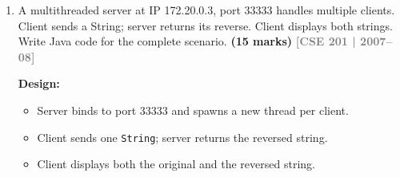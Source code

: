 \documentclass[12pt,a3paper]{article}
\newcommand{\yr}[1]{\hfill\textcolor{gray}{\small\textbf{[#1]}}}
\newcommand{\mk}[1]{\textcolor{orange!70!black}{\small\textbf{(#1 marks)}}}
\begin{document}
\begin{enumerate}
\begin{tcolorbox}
\medskip
\textbf{Step-by-step description:}

\begin{enumerate}[label=\textbf{\arabic*.}, itemsep=3pt]
  \item Server creates \texttt{ServerSocket} on port
  55555 and calls \texttt{accept()} --- it blocks,
  waiting for a client.
  \item Client creates \texttt{new Socket("server-IP",
  55555)}. The JVM performs the TCP three-way
  handshake (SYN, SYN-ACK, ACK).
  \item \texttt{accept()} returns a new
  \texttt{Socket} on the server side dedicated to
  this client. The \texttt{ServerSocket} resumes
  listening for more clients.
  \item Client writes data through
  \texttt{getOutputStream()}; server reads it via
  \texttt{getInputStream()}.
  \item Server writes a response through its
  \texttt{getOutputStream()}; client reads via its
  \texttt{getInputStream()}.
  \item Either side calls \texttt{close()} to
  terminate the connection (TCP FIN sequence).
\end{enumerate}

\end{tcolorbox}

\item A multithreaded server at IP 172.20.0.3, port 33333 handles multiple clients. Client sends a String; server returns its reverse. Client displays both strings. Write Java code for the complete scenario. \mk{15}
\yr{CSE 201 | 2007--08}

\begin{tcolorbox}[enhanced,breakable,ansbox,
  colback=cB!4,colframe=cB,boxrule=0.8pt,arc=5pt,
  title={\textbf{Answer — Multithreaded String-Reverse
  Server at 172.20.0.3:33333}},
  fonttitle=\bfseries\color{white},colbacktitle=cB]

\textbf{Design:}
\begin{itemize}[itemsep=2pt]
  \item Server binds to port 33333 and spawns a new
  thread per client.
  \item Client sends one \texttt{String}; server
  returns the reversed string.
  \item Client displays both the original and the
  reversed string.
\end{itemize}


\end{tcolorbox}
\end{enumerate}
\end{document}

